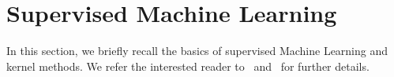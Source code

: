 \section{Supervised Machine Learning}\label{sec:learning}

In this section, we briefly recall the basics of supervised Machine Learning and kernel methods.
We refer the interested reader to~\cite{Friedman01} and~\cite{Shawe04} for further details.

